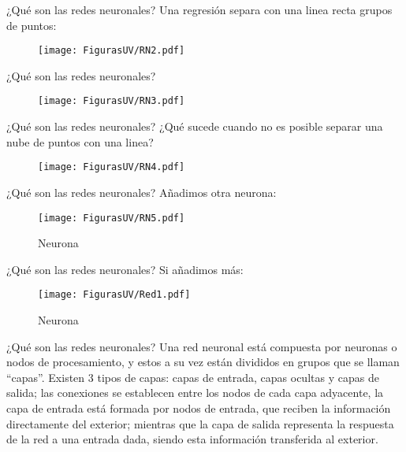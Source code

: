 \documentclass[10pt]{beamer}
\begin{document}
\begin{frame}{¿Qué son las redes neuronales?}
Una regresión separa con una linea recta grupos de puntos:

\begin{figure}[h!]
  \centering
  \texttt{[image: FigurasUV/RN2.pdf]}
\end{figure}

\end{frame}

\begin{frame}{¿Qué son las redes neuronales?}

\begin{figure}[h!]
  \centering
  \texttt{[image: FigurasUV/RN3.pdf]}
\end{figure}

\end{frame}

\begin{frame}{¿Qué son las redes neuronales?}
¿Qué sucede cuando no es posible separar una nube de puntos con una linea?

\begin{figure}[h!]
  \centering
  \texttt{[image: FigurasUV/RN4.pdf]}
\end{figure}

\end{frame}

\begin{frame}{¿Qué son las redes neuronales?}
Añadimos otra neurona:

\begin{figure}[h!]
  \centering
  \texttt{[image: FigurasUV/RN5.pdf]}
  \caption{Neurona}
\end{figure}

\end{frame}

\begin{frame}{¿Qué son las redes neuronales?}
Si añadimos más:

\begin{figure}[h!]
  \centering
  \texttt{[image: FigurasUV/Red1.pdf]}
  \caption{Neurona}
\end{figure}

\end{frame}

\begin{frame}{¿Qué son las redes neuronales?}
Una red neuronal está compuesta por neuronas o
nodos de procesamiento, y estos a su vez están divididos en grupos que se llaman ``capas''. Existen
3 tipos de capas: capas de entrada, capas ocultas y capas de salida; las conexiones se establecen
entre los nodos de cada capa adyacente, la capa de entrada está formada por nodos de entrada,
que reciben la información directamente del exterior; mientras que la capa de salida representa la
respuesta de la red a una entrada dada, siendo esta información transferida al exterior.

\end{frame}
\end{document}
